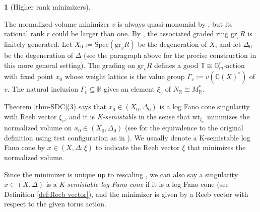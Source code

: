 \documentclass[12pt]{amsart}
\theoremstyle{definition}
\newtheorem{emp}[prop]{}
\newcommand{\bC}{\mathbb{C}}
\newcommand{\bR}{\mathbb{R}}
\newcommand{\Spec}{\mathrm{Spec}}
\newcommand{\gr}{\mathrm{gr}}
\newcommand{\wt}{\mathrm{wt}}
\numberwithin{equation}{section}
\begin{document}
\begin{emp}[Higher rank minimizers]\label{say-higherrank}

The normalized volume minimizer $v$ is always quasi-monomial by \cite{Xu-quasimonomial}, but its rational rank $r$ could be larger than one. By \cite{XZ-SDC}, the associated graded ring $\gr_v R$ is finitely generated. Let $X_0 := \Spec(\gr_v R)$ be the degeneration of $X$, and let $\Delta_0$ be the degeneration of $\Delta$ (see the paragraph above \cite[Lemma 2.58]{LX-higher-rank} for the precise construction in this more general setting). The grading on $\gr_v R$ defines a good $\mathbb{T}\cong \mathbb{G}_m^r$-action with fixed point $x_0$ whose weight lattice is the value group $\Gamma_v := v(\bC(X)^*)$ of $v$. The natural inclusion $\Gamma_v\subseteq \bR$ gives an element $\xi_v$ of $N_\bR\cong M^*_\bR$. 

Theorem \ref{thm-SDC}(3) says that $x_0 \in (X_0, \Delta_0)$ is a log Fano cone singularity with Reeb vector $\xi_v$, and it is \emph{K-semistable} in the sense that $\wt_{\xi_v}$ minimizes the normalized volume on $x_0 \in (X_0, \Delta_0)$ (see \cite[Theorem 2.34]{LX-higher-rank} for the equivalence to the original definition using test configuration as in \cite{CS-cone}). We usually denote a K-semistable log Fano cone by $x\in (X,\Delta;\xi)$ to indicate the Reeb vector $\xi$ that minimizes the normalized volume. 

Since the minimizer is unique up to rescaling \cite{XZ-uniqueness}, we can also say a singularity $x\in (X,\Delta)$ is a \emph{K-semistable log Fano cone} if it is a log Fano cone (see Definition \ref{def:Reeb vector}), and the minimizer is given by a Reeb vector with respect to the given torus action.

\end{emp}
\end{document}
